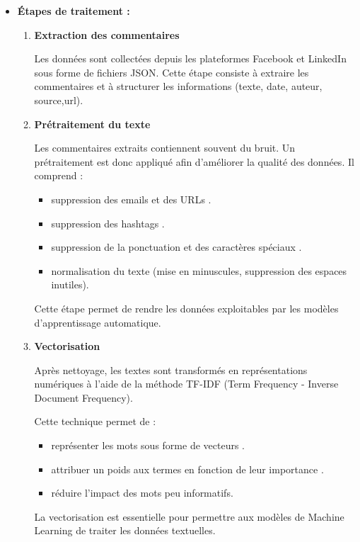 \documentclass[12pt,a4paper,oneside]{report}
\begin{document}
\begin{itemize}
    \item \textbf{Étapes de traitement :}

\begin{enumerate}
    \item \textbf{Extraction des commentaires}

Les données sont collectées depuis les plateformes Facebook et LinkedIn sous forme de fichiers JSON. Cette étape consiste à extraire les commentaires et à structurer les informations (texte, date, auteur,  source,url).

    \item \textbf{Prétraitement du texte}

Les commentaires extraits contiennent souvent du bruit. Un prétraitement est donc appliqué afin d’améliorer la qualité des données. Il comprend :

\begin{itemize}
    \item suppression des emails et des URLs .
    \item suppression des hashtags .
    \item suppression de la ponctuation et des caractères spéciaux .
    \item normalisation du texte (mise en minuscules, suppression des espaces inutiles).
\end{itemize}

Cette étape permet de rendre les données exploitables par les modèles d’apprentissage automatique.

    \item \textbf{Vectorisation}

Après nettoyage, les textes sont transformés en représentations numériques à l’aide de la méthode TF-IDF (Term Frequency - Inverse Document Frequency).

Cette technique permet de :

\begin{itemize}
    \item représenter les mots sous forme de vecteurs .
    \item attribuer un poids aux termes en fonction de leur importance .
    \item réduire l’impact des mots peu informatifs.
\end{itemize}

La vectorisation est essentielle pour permettre aux modèles de Machine Learning de traiter les données textuelles.


\end{enumerate}
\end{itemize}
\end{document}
